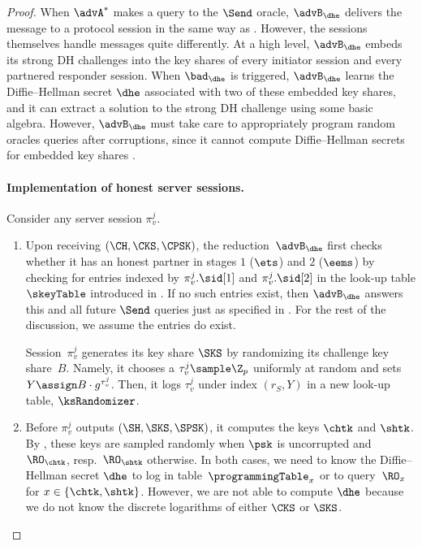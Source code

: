 \begin{proof}
	When $\advA^*$ makes a query to the $\Send$ oracle, $\advB_\dhe$ delivers the message to a protocol session in the same way as \thisGame.
	However, the sessions themselves handle messages quite differently.
	At a high level, $\advB_\dhe$ embeds its strong DH challenges into the key shares of every initiator session and every partnered responder session.
	When $\bad_{\dhe}$ is triggered, $\advB_\dhe$ learns the Diffie--Hellman secret $\dhe$ associated with two of these embedded key shares, and it can extract a solution to the strong DH challenge using some basic algebra.
	However, $\advB_\dhe$ must take care to appropriately program random oracles queries after corruptions, since it cannot compute Diffie--Hellman secrets for embedded key shares .
	
	
	\paragraph{Implementation of honest server sessions.}
	Consider any server session $\pi_v^j$.
	
	\begin{enumerate}
		\item Upon receiving $(\CH, \CKS, \CPSK)$, the reduction~$\advB_\dhe$ first checks whether it has an honest partner in stages $1$ ($\ets$) and $2$ ($\eems$) by checking for entries indexed by $\pi_v^j.\sid[1]$ and $\pi_v^j.\sid[2]$ in the look-up table $\skeyTable$ introduced in .
		If no such entries exist, then $\advB_\dhe$ answers this and all future $\Send$ queries just as specified in \thisGame.
		For the rest of the discussion, we assume the entries do exist.
		
		Session~$\pi_v^j$ generates its key share $\SKS$ by randomizing its challenge key share~$B$. 
		Namely, it chooses  a  $\tau_v^j \sample \Z_p$ uniformly at random and sets $Y \assign B \cdot g^{\tau_v^j}$.
		Then, it logs $\tau_v^j$ under index $(r_S, Y)$ in a new look-up table, $\ksRandomizer$.
%		
		\item Before $\pi_v^j$ outputs $(\SH,\SKS, \SPSK)$, it computes the keys $\chtk$ and $\shtk$.
		By , these keys are sampled randomly when $\psk$ is uncorrupted and  $\RO_{\chtk}$, resp.\ $\RO_{\shtk}$ otherwise.
		In both cases, we need to know the Diffie--Hellman secret $\dhe$ to log in table~$\programmingTable_x$ or to query~$\RO_x$ for $x \in \{\chtk, \shtk\}$.
		However, we are not able to compute $\dhe$ because we do not know the discrete logarithms of either $\CKS$ or $\SKS$.
		

\end{enumerate}
\end{proof}

